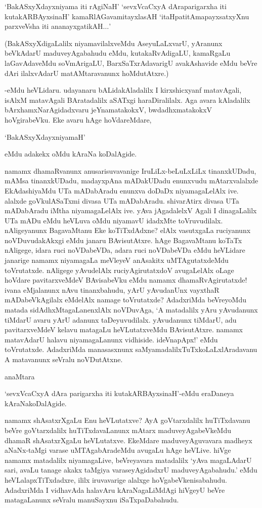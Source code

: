 `BakASxyXdayxniyama iti rAgiNaH' `sevxVcaCxyA dAraparigarxha iti kutakARBAyxsinaH' kamaRlAGavamitayxlasAH `itaHpatitAmapayxsatxyXnu parxveVsha iti ananayxgatikAH$\ldots$'

(BakASxyXdigaLalilx niyamavilalxveMdu AseyuLaLxvarU, yAranunx beVkAdarU maduveyAgabahudu eMdu, kutakaRvAdigaLU, kamaRgaLu laGavAdaveMdu soVmArigaLU, BarxSaTxrAdavarigU avakAshavide eMdu beVre dAri ilalxvAdarU matAMtaravanunx hoMdutAtxre.)

-eMdu heVLidaru. udayanaru bALidakAladalilx I kirxshicxyanf matavAgali, isAlxM matavAgali BAratadalilx aSATxgi haraDiralilalx. Aga avara kAladalilx bArxhamxNarAgidadxvaru jeYnamatakokxV, bwdadhxmatakokxV hoVgirabeVku. Eke avaru hAge hoVdareMdare,

`BakASxyXdayxniyamaH'

eMdu adakekx oMdu kAraNa koDalAgide.

namamx dhamaRvanunx anusarisuvavanige IruLiLx-beLuLxLiLx tinanxkUDadu, mAMsa tinanxkUDadu, madayxpAna mADakUDadu enunxvudu mAtarxvalalxde EkAdashiyaMdu UTa mADabAradu enunxva doDaDx niyamagaLelAlx ive. alalxde goVkulASaTxmi divasa UTa mADabAradu. shivarAtirx divasa UTa mADabAradu iMtha niyamagaLelAlx ive. yAva jAgadalelxV Agali I dinagaLalilx UTa mADu eMdu heVLuva oMdu niyamavU idadxMte toVruvudilalx. nAligeyanunx BagavaMtanu Eke koTiTxdAdxne? elAlx vasutxgaLa ruciyanunx noVDuvudakAkxgi eMdu janaru BAvisutAtxre. hAge BagavaMtanu koTaTx nAligege, idara ruci noVDabeVDa, adara ruci noVDabeVDa eMdu heVLidare janarige namamx niyamagaLa meVleyeV anAsakitx uMTAgutatxdeMdu toVrutatxde. nAligege yAvudelAlx
ruciyAgirutatxdoV avugaLelAlx oLage hoVdare pavitarxveMdeV BAvisabeVku eMdu namamx dhamaRvAgirutatxde! ivana eMjalanunx nAvu tinanxbahudu, yArU yAvudanUnx vayxthaR mADabeVkAgilalx eMdelAlx namage toVrutatxde? AdadxriMda beVreyoMdu matada sidAdhxMtagaLanenxlAlx noVDuvAga, `A matadalilx yAru yAvudanunx tiMdarU avaru yArU adanunx taDeyuvudilalx. yAvudanunx tiMdarU, adu pavitarxveMdeV kelavu matagaLu heVLutatxveMdu BAvisutAtxre. namamx matavAdarU halavu niyamagaLanunx vidhiside. ideVnapApx!' eMdu toVrutatxde. AdadxriMda 
manasasxnunx saMyamadalilxTuTxkoLaLxlAradavanu A matavanunx seVralu noVDutAtxne.

anaMtara 

`sevxVcaCxyA dAra parigarxha iti kutakARBAyxsinaH'-eMdu eraDaneya kAraNakoDalAgide.

namamx shAsatxrXgaLu Enu heVLutatxve? AyA goVtarxdalilx huTiTxdavanu beVre goVtarxdalilx huTiTxdavaLanunx mAtarx maduveyAgabeVkeMdu dhamaR shAsatxrXgaLu heVLutatxve. EkeMdare maduveyAguvavara madheyx aNaNx-taMgi varase uMTAgabAradeMdu avugaLu hAge heVLive. hiVge 
namamx matadalilx niyamagaLive, beVreyavara matadalilx `yAva magaLAdarU sari, avaLu tanage akakx taMgiya varaseyAgidadxrU maduveyAgabahudu.' eMdu heVLalapxTiTxdadxre, ililx iruvavarige alalxge hoVgabeVkenisabahudu. AdadxriMda I vidhavAda halavAru kAraNagaLiMdAgi 
hiVgeyU beVre matagaLanunx seVralu manuSayxnu iSaTxpaDabahudu.


